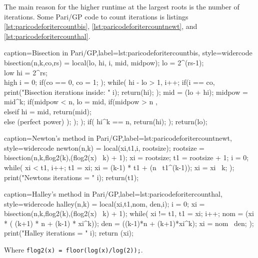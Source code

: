 \documentclass[a4paper,10pt]{report}
\theoremstyle{plain} %
\theoremstyle{definition}
\theoremstyle{remark}
\begin{document}
\begin{center}

\end{center}

The main reason for the higher runtime at the largest roots is the number of iterations. Some Pari/GP code to count iterations is listings \ref{lst:paricodeforitercountbis}, \ref{lst:paricodeforitercountnewt}, and \ref{lst:paricodeforitercounthal}.

\lstset{language=parigp,style=code}
\begin{pblisting}{caption={Bisection in Pari/GP},label=lst:paricodeforitercountbis, style=widercode}
bisection(n,k,co,rs) = {
  local(lo, hi, i, mid, midpow);
  lo = 2^(rs-1); \\ low
  hi = 2^rs;     \\ high
  i = 0;
  if(co == 0,
     co = 1;
  );
  while(
    hi - lo > 1,
    i++;
    if(i == co,
       print("Bisection iterations inside: " i);
       return(hi);
    );
    mid = (lo + hi)\2;
    midpow = mid^k;
    if(midpow < n,
       lo = mid,
       if(midpow > n , \\elseif
          hi = mid,
          return(mid); \\ else (perfect power)
       );
    );  
  );
  if( hi^k == n,
    return(hi);
  );
  return(lo);
}
\end{pblisting}
\begin{pblisting}{caption={Newton's method in Pari/GP},label=lst:paricodeforitercountnewt, style=widercode}
newton(n,k) = {
   local(xi,t1,i, rootsize);
   rootsize = bisection(n,k,flog2(k),(flog2(x) \ k) + 1);
   xi = rootsize;
   t1 = rootsize + 1;
   i = 0;
   while(
      xi < t1,
      i++;
      t1 = xi;
      xi = (k-1) * t1 + (n \ t1^(k-1));
      xi = xi \ k;
   );
   print("Newtons iterations = " i);
   return(t1);
}
\end{pblisting}
\begin{pblisting}{caption={Halley's method in Pari/GP},label=lst:paricodeforitercounthal, style=widercode}
halley(n,k) = {
   local(xi,t1,nom, den,i);
   i = 0;
   xi = bisection(n,k,flog2(k),(flog2(x) \ k) + 1);
   while(
      xi != t1,
      t1 = xi;
      i++;
      nom = (xi * ( (k+1) * n + (k-1) * xi^k));
      den = ((k-1)*n + (k+1)*xi^k);
      xi = nom \ den;
   );
   print("Halley iterations = " i);
   return (xi);
}
\end{pblisting}
Where \lstinline!flog2(x) = floor(log(x)/log(2));!.
\end{document}
